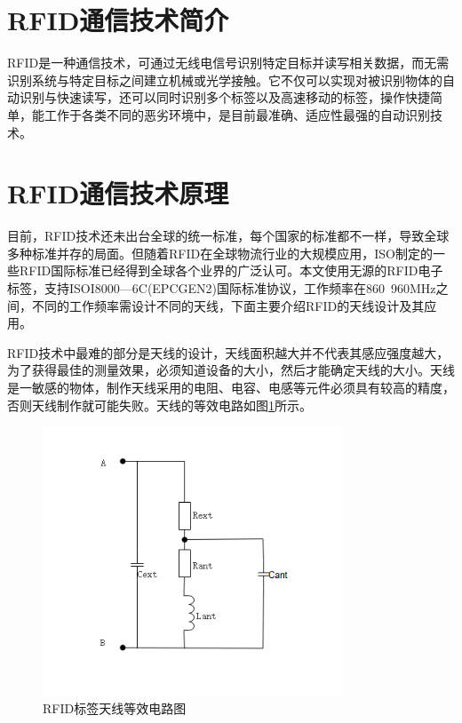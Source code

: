 \documentclass[a4paper]{ctexart}
\begin{document}
\tableofcontents %
\newpage
\begin{spacing}{1.5}
\songti{}
\section{RFID通信技术简介}
RFID是一种通信技术，可通过无线电信号识别特定目标并读写相关数据，而无需识别系统与特定目标之间建立机械或光学接触。它不仅可以实现对被识别物体的自动识别与快速读写，还可以同时识别多个标签以及高速移动的标签，操作快捷简单，能工作于各类不同的恶劣环境中，是目前最准确、适应性最强的自动识别技术。

\section{RFID通信技术原理}
目前，RFID技术还未出台全球的统一标准，每个国家的标准都不一样，导致全球多种标准并存的局面。但随着RFID在全球物流行业的大规模应用，ISO制定的一些RFID国际标准已经得到全球各个业界的广泛认可。本文使用无源的RFID电子标签，支持ISOI8000—6C(EPCGEN2)国际标准协议，工作频率在860~960MHz之间，不同的工作频率需设计不同的天线，下面主要介绍RFID的天线设计及其应用。

RFID技术中最难的部分是天线的设计，天线面积越大并不代表其感应强度越大，为了获得最佳的测量效果，必须知道设备的大小，然后才能确定天线的大小。天线是一敏感的物体，制作天线采用的电阻、电容、电感等元件必须具有较高的精度，否则天线制作就可能失败。天线的等效电路如图\ref{circ}所示。

\begin{figure}[htbp]
	\centering
	\includegraphics [width=0.8\textwidth]{figure//circ.png}
	\caption{RFID标签天线等效电路图}\label{circ}
\end{figure}


\end{spacing}
\end{document}
